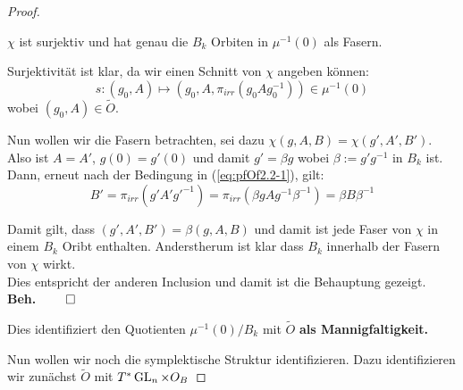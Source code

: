 \begin{proof}
\begin{comment}
  & \text{\color{red}so ist das falsch?!?}
\\&=g(0)g(0)^{-1}+g(0)(g_i)^{-1}\xi^1+\dots+g(0)(g_k)^{-1}\xi^k
\\&=1+g(0)(g_i)^{-1}\xi^1+\dots+g(0)(g_k)^{-1}\xi^k \in B_k
\end{align*}
ODER.
\[
(g(0))^{-1} \overset{\text{\color{red}?}}= g^{-1}(0)
\]
\end{comment}
\begin{beh}
$\chi$ ist surjektiv und hat genau die $B_k$ Orbiten in $\mu^{-1}(0)$ als
Fasern.
\end{beh}
Surjektivität ist klar, da wir einen Schnitt von $\chi$ angeben können:
\[
s:(g_0,A)\mapsto (g_0,A,\pi_{irr}(g_0Ag_0^{-1}))\in\mu^{-1}(0)
\]
wobei $(g_0,A)\in\tilde O$.
\begin{comment}
\[
\chi\circ s=\Big((g_0,A)\overset s\mapsto(g_0,A,\pi_{irr}(g_0Ag_0^{-1}))
  \overset\chi\mapsto(\underset{=g_0}{\underbrace{g_0(0)}},A)\Big)
  =\id_{\mu^{-1}(0)}
\]
\end{comment}
Nun wollen wir die Fasern betrachten, sei dazu $\chi(g,A,B)=\chi(g',A',B')$.
Also ist $A=A'$, $g(0)=g'(0)$ und damit $g'=\beta g$ wobei $\beta:=g'g^{-1}$ in
$B_k$ ist.
Dann, erneut nach der Bedingung in (\ref{eq:pfOf2.2-1}), gilt:
\[
B'=\pi_{irr}(g'A'g'^{-1})=\pi_{irr}(\beta gAg^{-1}\beta^{-1})=\beta B\beta^{-1}
\]
\begin{comment}
\begin{align*}
B'&\overset{(\ref{eq:pfOf2.2-1})}=
  \pi_{irr}(g'A'g'^{-1})  \overset{A'=A}{=}
    \pi_{irr}\left(g'\left(g^{-1}g\right)A\left(g^{-1}g\right)g'^{-1}\right)
    =\pi_{irr}(\beta gAg^{-1}\beta^{-1})
\\& =\beta \pi_{irr}(gAg^{-1}) \beta^{-1}
    \overset{(\ref{eq:pfOf2.2-1})}=\beta B\beta^{-1}
\end{align*}
\end{comment}
Damit gilt, dass $(g',A',B')=\beta(g,A,B)$ und damit ist jede Faser von $\chi$
in einem $B_k$ Oribt enthalten.
Anderstherum ist klar dass $B_k$ innerhalb der Fasern von $\chi$ wirkt.
\\Dies entspricht der anderen Inclusion und damit ist die Behauptung gezeigt.
{\hfill \textbf{Beh.} \ensuremath{\qed}}

Dies identifiziert den Quotienten $\mu^{-1}(0)/B_k$ mit $\tilde O$ \textbf{als
Mannigfaltigkeit.}

Nun wollen wir noch die symplektische Struktur identifizieren. Dazu
identifizieren wir zunächst $\tilde O$ mit $T^*\operatorname{GL}_n\times O_B$

\TODO
\end{proof}

